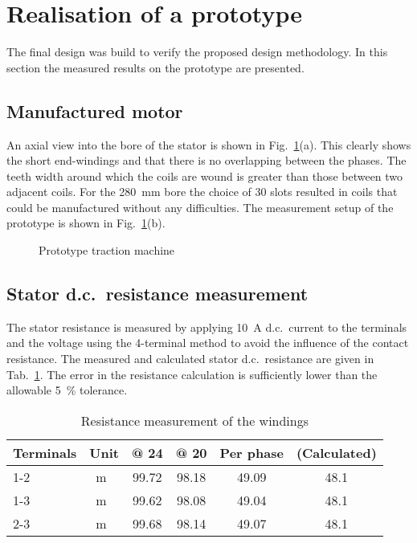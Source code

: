 \section{Realisation of a prototype}\label{sec:prototype}
The final design was build to verify the proposed design methodology. In this section the measured results on the prototype are presented. 

\subsection{Manufactured motor}
An axial view into the bore of the stator is shown in Fig.~\ref{fig:prototype}(a). This clearly shows the short end-windings and that there is no overlapping between the phases. The teeth width around which the coils are wound is greater than those between two adjacent coils. For the \SI{280}{mm} bore the choice of 30 slots resulted in coils that could be manufactured without any difficulties. The measurement setup of the prototype is shown in Fig.~\ref{fig:prototype}(b).
\begin{figure}[htbp]
	\centering
		
	\caption{Prototype traction machine}
	\label{fig:prototype}
\end{figure}

\subsection{Stator d.c.~resistance measurement}
The stator resistance is measured by applying \SI{10}{A} d.c.~current to the terminals and the voltage using the 4-terminal method to avoid the influence of the contact resistance. The measured and calculated stator d.c.~resistance are given in Tab.~\ref{tab:ResistanceMeasurementOfTheWindings}. The error in the resistance calculation is sufficiently lower than the allowable \SI{5}{\%} tolerance. 
\begin{table}[htbp]
	\centering
	\caption{Resistance measurement of the windings}
	\begin{tabular}{llcccc}
		\toprule
		Terminals &  Unit &  @ \SI{24}{\degC} & @ \SI{20}{\degC} & Per phase & (Calculated)\\
		\midrule
		1-2 & \SI{}{m\Omega} & 99.72 & 98.18 & 49.09 & 48.1\\ 
	  1-3 & \SI{}{m\Omega} & 99.62 & 98.08 & 49.04 & 48.1\\
		2-3 & \SI{}{m\Omega} & 99.68 & 98.14 & 49.07 & 48.1\\	
		\bottomrule
	\end{tabular}
	\label{tab:ResistanceMeasurementOfTheWindings}
\end{table}

